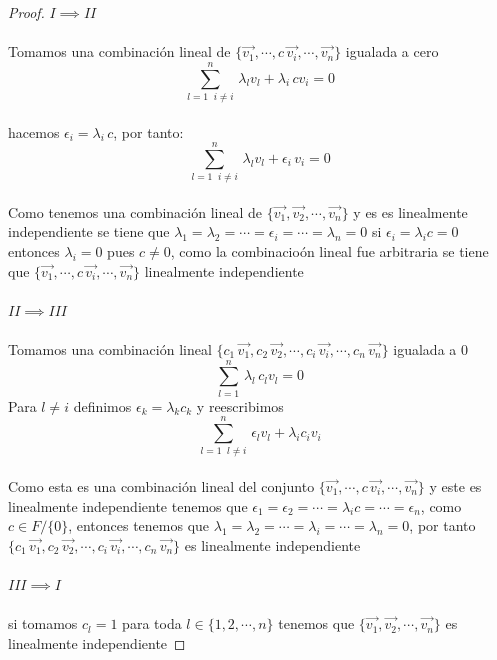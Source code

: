 \documentclass[11pt,letterpaper]{article}
\begin{document}
\begin{proof}
$I\implies II$\,\\
\,\\
Tomamos una combinaci\'on lineal de $\{\vec{v_1},\cdots,c\,\vec{v_i},\cdots,\vec{v_n}\}$ igualada a cero\,\\
\begin{equation*}
    \sum_{l=1\,\,\:i\neq i}^{n}\,\lambda_l v_l+\lambda_i\,cv_i=0
\end{equation*}\,\\
hacemos $\epsilon_i=\lambda_i\,c$, por tanto:\,\\
\begin{equation*}
    \sum_{l=1\,\,\:i\neq i}^{n}\,\lambda_l v_l+\epsilon_i\,v_i=0
\end{equation*}\,\\
Como tenemos una combinaci\'on lineal de $\{\vec{v_1},\vec{v_2},\cdots, \vec{v_n}\}$ y es es linealmente independiente se tiene que $\lambda_1=\lambda_2=\cdots=\epsilon_i=\cdots=\lambda_n=0$
si $\epsilon_i=\lambda_ic=0$ entonces $\lambda_i=0$ pues $c\neq 0$, como la combinacio\'on lineal fue arbitraria se tiene que  $\{\vec{v_1},\cdots,c\,\vec{v_i},\cdots,\vec{v_n}\}$ linealmente independiente\,\\
\,\\
$II\implies III$\,\\
\,\\
Tomamos una combinaci\'on lineal $\{c_1\,\vec{v_1},c_2\,\vec{v_2},\cdots,c_i\,\vec{v_i},\cdots,c_n\,\vec{v_n}\}$ igualada a 0\,\\
    \begin{equation*}
        \sum_{l=1}^{n}\,\lambda_l\,c_lv_l=0
    \end{equation*}
    Para $l\neq i$ definimos $\epsilon_k=\lambda_kc_k$ y reescribimos\,\\
    \begin{equation*}
        \sum_{l=1\,\,\:l\neq i}^{n}\,\epsilon_lv_l+\lambda_ic_iv_i
    \end{equation*}\,\\
    Como esta es una combinaci\'on lineal del conjunto $\{\vec{v_1},\cdots,c\,\vec{v_i},\cdots,\vec{v_n}\}$ y este es linealmente independiente tenemos que 
    $\epsilon_1=\epsilon_2=\cdots=\lambda_ic=\cdots=\epsilon_n$, como $c\in F/\{0\}$, entonces tenemos que $\lambda_1=\lambda_2=\cdots=\lambda_i=\cdots=\lambda_n=0$, por tanto
    $\{c_1\,\vec{v_1},c_2\,\vec{v_2},\cdots,c_i\,\vec{v_i},\cdots,c_n\,\vec{v_n}\}$ es linealmente independiente\,\\
    \,\\
    $III\implies I$\,\\
    \,\\
    si tomamos $c_l=1$ para toda $l\in \{1,2,\cdots,n\}$ tenemos que $\{\vec{v_1},\vec{v_2},\cdots, \vec{v_n}\}$ es linealmente independiente

\end{proof}
\end{document}
